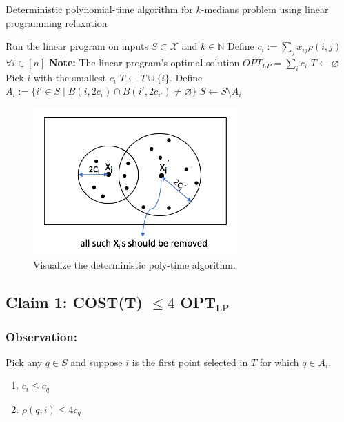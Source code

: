 \begin{algorithm}[H]
\caption{Deterministic polynomial-time algorithm for $k$-medians problem using linear programming relaxation}\label{kmedian}
\begin{algorithmic}
\STATE Run the linear program on inputs $S\subset \mathcal{X}$ and $k\in\mathbb{N}$
\STATE Define $c_i:=\sum_j x_{ij}\rho(i, j)$ $\forall i\in[n]$
\STATE \textbf{Note:} The linear program's optimal solution $OPT_{LP}=\sum_i c_i$
\STATE $T\leftarrow \varnothing$
\STATE Pick $i$ with the smallest $c_i$
\STATE $T\leftarrow T\cup\{i\}$.
\STATE Define $A_i:=\{i'\in S\;|\; B(i,2c_i)\cap B(i', 2c_{i'})\neq\varnothing\}$
\STATE $S\leftarrow S\setminus A_i$
\ENDWHILE
\end{algorithmic}
\end{algorithm}

\begin{figure}[h]
\centering
\includegraphics[width=0.7\textwidth]{chapter_1/files/kmedians_polytime_algo}
\caption{Visualize the deterministic poly-time algorithm. }
\end{figure}

\subsection*{Claim 1: COST(T) $\leq 4$ OPT$_{\text{LP}}$}
\subsubsection*{Observation:}
Pick any $q \in S$ and suppose $i$ is the first point selected in $T$  for which $q \in A_i$.

\begin{enumerate}
  \item $c_i \leq c_q$
  \item $\rho(q, i) \leq 4 c_q$
\end{enumerate}

